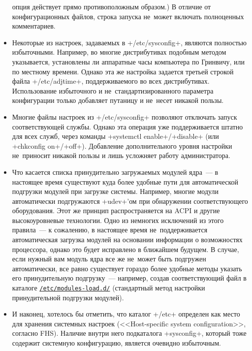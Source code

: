 \documentclass[10pt,oneside,a4paper]{article}
\newcommand{\hreftt}[2]{\href{#1}{\texttt{#2}}}
\begin{document}
\begin{itemize}
		опция действует прямо противоположным образом.) В отличие от
		конфигурационных файлов, строка запуска не~может включать
		полноценных комментариев.
	\item Некоторые из настроек, задаваемых в +/etc/sysconfig+, являются
		полностью избыточными. Например, во многие дистрибутивах
		подобным методом указывается, установлены ли аппаратные часы
		компьютера по Гринвичу, или по местному времени. Однако эта же
		настройка задается третьей строкой файла +/etc/adjtime+,
		поддерживаемого во всех дистрибутивах. Использование
		избыточного и не~стандартизированного параметра конфигурации
		только добавляет путаницу и не~несет никакой пользы.
	\item Многие файлы настроек из +/etc/sysconfig+ позволяют отключать
		запуск соответствующей службы. Однако эта операция уже
		поддерживается штатно для всех служб, через команды
		+systemctl enable+/+disable+ (или +chkconfig on+/+off+).
		Добавление дополнительного уровня настройки не~приносит никакой
		пользы и лишь усложняет работу администратора.
	\item Что касается списка принудительно загружаемых модулей ядра~--- в
		настоящее время существуют куда более удобные пути для
		автоматической подгрузки модулей при загрузке системы. Например,
		многие модули автоматически подгружаются +udev+'ом при
		обнаружении соответствующего оборудования. Этот же принцип
		распространяется на ACPI и другие высокоуровневые технологии.
		Одно из немногих исключений из этого правила~--- к сожалению, в
		настоящее время не~поддерживается автоматическая загрузка
		модулей на основании информации о возможностях процессора,
		однако это будет исправлено в ближайшем будущем. В случае, если
		нужный вам модуль ядра все же не~может быть подгружен
		автоматически, все равно существует гораздо более удобные методы
		указать его принудительную подгрузку~--- например, создав
		соответствующий файл в каталоге
		\hreftt{http://0pointer.de/public/systemd-man/modules-load.d.html}{/etc/modules-load.d/}
		(стандартный метод настройки принудительной подгрузки модулей).
	\item И наконец, хотелось бы отметить, что каталог +/etc+ определен как
		место для хранения системных настроек (<<Host-specific system
		configuration>>, согласно FHS). Наличие внутри него подкаталога
		+sysconfig+, который тоже содержит системную конфигурацию,
		является очевидно избыточным.
\end{itemize}
\end{document}
